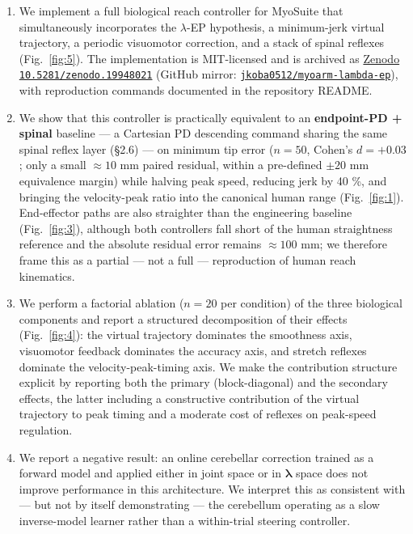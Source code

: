 \documentclass[sn-basic]{sn-jnl}
\providecommand{\tightlist}{\setlength{\itemsep}{0pt}\setlength{\parskip}{0pt}}
\begin{document}
\begin{enumerate}
\def\labelenumi{\arabic{enumi}.}
\tightlist
\item
  We implement a full biological reach controller for MyoSuite that
  simultaneously incorporates the $\lambda$-EP hypothesis, a minimum-jerk
  virtual trajectory, a periodic visuomotor correction, and a stack of
  spinal reflexes (Fig.~\ref{fig:5}). The implementation is MIT-licensed and is
  archived as \href{https://doi.org/10.5281/zenodo.19948021}{Zenodo
  \texttt{10.5281/zenodo.19948021}} (GitHub mirror:
  \href{https://github.com/jkoba0512/myoarm-lambda-ep}{\texttt{jkoba0512/myoarm-lambda-ep}}),
  with reproduction commands documented in the repository README.
\item
  We show that this controller is practically equivalent to an
  \textbf{endpoint-PD + spinal} baseline --- a Cartesian PD descending
  command sharing the same spinal reflex layer (§2.6) --- on minimum tip
  error (\(n = 50\), Cohen's \(d = +0.03\); only a small \(\approx 10\)
  mm paired residual, within a pre-defined \(\pm 20\) mm equivalence
  margin) while halving peak speed, reducing jerk by 40 \%, and bringing
  the velocity-peak ratio into the canonical human range (Fig.~\ref{fig:1}).
  End-effector paths are also straighter than the engineering baseline
  (Fig.~\ref{fig:3}), although both controllers fall short of the human
  straightness reference and the absolute residual error remains
  \(\approx 100\) mm; we therefore frame this as a partial --- not a
  full --- reproduction of human reach kinematics.
\item
  We perform a factorial ablation (\(n = 20\) per condition) of the
  three biological components and report a structured decomposition of
  their effects (Fig.~\ref{fig:4}): the virtual trajectory dominates the
  smoothness axis, visuomotor feedback dominates the accuracy axis, and
  stretch reflexes dominate the velocity-peak-timing axis. We make the
  contribution structure explicit by reporting both the primary
  (block-diagonal) and the secondary effects, the latter including a
  constructive contribution of the virtual trajectory to peak timing and
  a moderate cost of reflexes on peak-speed regulation.
\item
  We report a negative result: an online cerebellar correction trained
  as a forward model and applied either in joint space or in
  \(\boldsymbol{\lambda}\) space does not improve performance in this
  architecture. We interpret this as consistent with --- but not by
  itself demonstrating --- the cerebellum operating as a slow
  inverse-model learner rather than a within-trial steering controller.
\end{enumerate}
\end{document}

